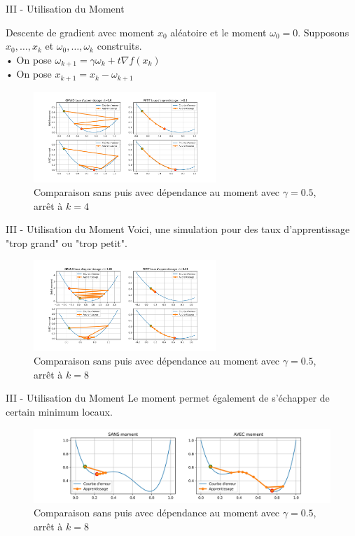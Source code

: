 \documentclass[10pt]{beamer}
\begin{document}
\begin{frame}{III - Utilisation du Moment}
\begin{block}{Descente de gradient avec moment}
$x_0$ aléatoire et le moment $\omega_0 = 0$.
Supposons $x_0, \ldots, x_k$ et $\omega_0, \ldots, \omega_k$ construits. \\
    • On pose $\omega_{k+1} = \gamma \omega_k + t \nabla f(x_k)$ \\
    • On pose $x_{k+1} = x_k - \omega_{k+1}$ 
\end{block}
\begin{figure}
	\centering
    \includegraphics[height=130px, trim=0 35 0 35, clip]{3-Moment.jpg}
	\caption{Comparaison sans puis avec dépendance au moment avec $\gamma = 0.5$, arrêt à $k=4$}
\end{figure}
\end{frame}

\begin{frame}{III - Utilisation du Moment}
Voici, une simulation pour des taux d'apprentissage "trop grand" ou "trop petit".
\begin{figure}
	\centering
    \includegraphics[height=130px, trim=0 35 0 35, clip]{4-Moment.jpg}
	\caption{Comparaison sans puis avec dépendance au moment avec $\gamma = 0.5$, arrêt à $k=8$}
\end{figure}
\end{frame}

\begin{frame}{III - Utilisation du Moment}
Le moment permet également de s'échapper de certain minimum locaux.
\begin{figure}
	\centering
    \includegraphics[width=\textwidth, trim=0 10 0 10, clip]{5-Moment.jpg}
	\caption{Comparaison sans puis avec dépendance au moment avec $\gamma = 0.5$, arrêt à $k=8$}
\end{figure}
\end{frame}
\end{document}
